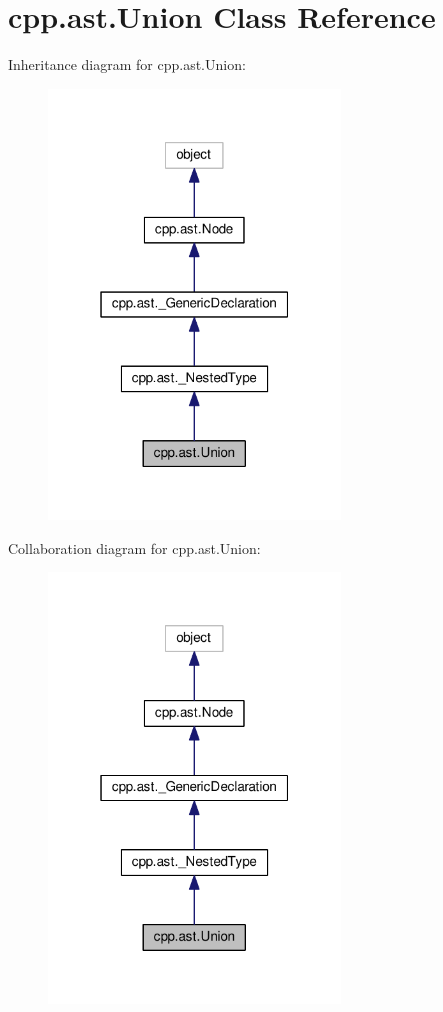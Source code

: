 \hypertarget{classcpp_1_1ast_1_1Union}{}\section{cpp.\+ast.\+Union Class Reference}
\label{classcpp_1_1ast_1_1Union}


Inheritance diagram for cpp.\+ast.\+Union\+:\nopagebreak
\begin{figure}[H]
\begin{center}
\leavevmode
\includegraphics[width=220pt]{classcpp_1_1ast_1_1Union__inherit__graph}
\end{center}
\end{figure}


Collaboration diagram for cpp.\+ast.\+Union\+:\nopagebreak
\begin{figure}[H]
\begin{center}
\leavevmode
\includegraphics[width=220pt]{classcpp_1_1ast_1_1Union__coll__graph}
\end{center}
\end{figure}
